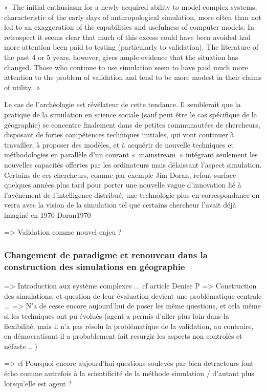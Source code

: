 « The initial enthusiasm for a newly acquired ability to model complex systems, characteristic of the early days of anthropological simulation, more often than not led to an exaggeration of the capabilities and usefulness of computer models. In retrospect it seems clear that much of this excess could have been avoided had more attention been paid to testing (particularly to validation). The literature of the past 4 or 5 years, however, gives ample evidence that the situation has changed. Those who continue to use simulation seem to have paid much more attention to the problem of validation and tend to be more modest in their claims of utility. »

Le cas de l'archéologie est révélateur de cette tendance. Il semblerait que la pratique de la simulation en science sociale (sauf peut être le cas spécifique de la géographie) se concentre finalement dans de petites communautées de chercheurs, disposant de fortes compétences techniques initiales, qui vont continuer à travailler, à proposer des modèles, et à acquérir de nouvelle techniques et méthodologies en parallèle d'un courant « mainstream » intégrant seulement les nouvelles capacités offertes par les ordinateurs mais délaissant l'aspect simulation. Certains de ces chercheurs, comme par exemple Jim Doran, refont surface quelques années plus tard pour porter une nouvelle vague d'innovation lié à l'avénement de l'intelligence distribué, une technologie plus en correspondance on verra avec la vision de la simulation tel que certains chercheur l'avait déjà imaginé en 1970 {Doran1970}

=> Validation comme nouvel enjeu ?

\subsubsection{Changement de paradigme et renouveau dans la construction des simulations en géographie }

=> Introduction aux système complexes ... cf article Denise P
=> Construction des simulations, et question de leur évaluation devient une problématique centrale ...
=> N'a de cesse encore aujourd'hui de poser les même questions, et cela même si les techniques ont pu évolués (agent a permis d'aller plus loin dans la flexibilité, mais il n'a pas résolu la problématique de la validation, au contraire, en démocratisant il a probablement fait resurgir les aspects non controlés et néfaste .. ) 

=> cf Pourquoi encore aujourd'hui questions soulevés par bien detracteurs font écho comme autrefois à la scientificité de la méthode simulation / d'autant plus lorsqu'elle est agent ? 

